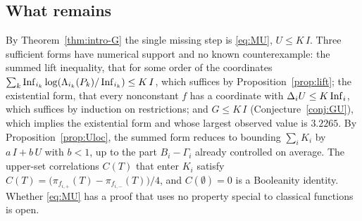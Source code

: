 \subsection{What remains}
By Theorem~\ref{thm:intro-G} the single missing step is \eqref{eq:MU}, $U\le K\,I$. Three sufficient forms have numerical support and no known counterexample: the summed lift inequality, that for some order of the coordinates $\sum_k\operatorname{Inf}_{i_k}\log(\Lambda_{i_k}(P_k)/\operatorname{Inf}_{i_k})\le K\,I$, which suffices by Proposition~\ref{prop:lift}; the existential form, that every nonconstant $f$ has a coordinate with $\Delta_iU\le K\operatorname{Inf}_i$, which suffices by induction on restrictions; and $G\le K\,I$ (Conjecture~\ref{conj:GU}), which implies the existential form and whose largest observed value is $3.2265$. By Proposition~\ref{prop:Uloc}, the summed form reduces to bounding $\sum_iK_i$ by $a\,I+b\,U$ with $b<1$, up to the part $B_i-\Gamma_i$ already controlled on average. The upper-set correlations $C(T)$ that enter $K_i$ satisfy $C(T)=\bigl(\pi_{f_{i,+}}(T)-\pi_{f_{i,-}}(T)\bigr)/4$, and $C(\emptyset)=0$ is a Booleanity identity. Whether \eqref{eq:MU} has a proof that uses no property special to classical functions is open.
